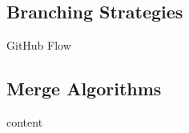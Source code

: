 \subsection{Branching Strategies}
\begin{frame}{\insertsubsection {}}
	\begin{fancycolumns}[animation=none]
		\begin{definition}{GitHub Flow}
		\end{definition}\pause
		\nextcolumn
		\centering{}
	\end{fancycolumns}
\end{frame}

\subsection{Merge Algorithms}
\begin{frame}{\insertsubsection}
	\begin{fancycolumns}[animation=none]
		\begin{definition}{}
		\end{definition}\pause
		\nextcolumn
		\begin{definition}{}
			content
		\end{definition}\pause
	\end{fancycolumns}
\end{frame}

       	